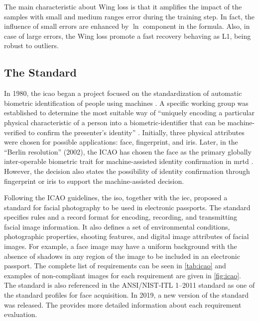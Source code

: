 The main characteristic about Wing loss is that it amplifies the impact of the samples with small and medium ranges error during the training step. In fact, the influence of small errors are enhanced by $\ln$ component in the formula. Also, in case of large errors, the Wing loss promote a fast recovery behaving as L1, being robust to outliers.

\subsection{The \icao Standard}

In 1980, the \acf{icao} began a project focused on the standardization of automatic biometric identification of people using machines \citep{icao2003report}. A specific working group was established to determine the most suitable way of ``uniquely encoding a particular physical characteristic of a person into a biometric-identifier that can be machine-verified to confirm the presenter's identity'' \citep{icao2003report}. Initially, three physical attributes were chosen for possible applications: face, fingerprint, and iris. Later, in the ``Berlin resolution'' (2002), the ICAO has chosen the face as the primary globally inter-operable biometric trait for machine-assisted identity confirmation in \acf{mrtd} \citep{ferrara2012face}. However, the decision also states the possibility of identity confirmation through fingerprint or iris to support the machine-assisted decision.

Following the ICAO guidelines, the \acf{iso}, together with the \acf{iec}, proposed a standard for facial photography to be used in electronic passports. The \icao \citep{iso-iec} standard specifies rules and a record format for encoding, recording, and transmitting facial image information. It also defines a set of environmental conditions, photographic properties, shooting features, and digital image attributes of facial images. For example, a face image may have a uniform background with the absence of shadows in any region of the image to be included in an electronic passport. The complete list of requirements can be seen in \autoref{tab:icao} and examples of non-compliant images for each requirement are given in \autoref{fig:icao}. The \icao standard is also referenced in the ANSI/NIST-ITL 1–2011 standard \citep{nist2011} as one of the standard profiles for face acquisition. In 2019, a new version of the \icao standard was released. The \icaonew provides more detailed information about each requirement evaluation.

